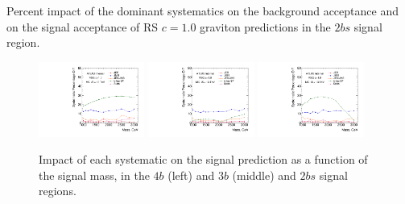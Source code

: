 
\begin{table}[htbp!]
\scriptsize
\begin{center}

\caption{Percent impact of the dominant systematics on the  background acceptance
         and on the signal acceptance of RS $c=1.0$ graviton predictions in the $2bs$ signal region.}
\label{tab:summary-systematics-2b}
\end{center}
\end{table}

\begin{figure}[htbp!]
\begin{center}
\includegraphics[width=0.31\textwidth,angle=-90]{figures/boosted/Syst_MC/FourTag_RSG_syst.pdf}
\includegraphics[width=0.31\textwidth,angle=-90]{figures/boosted/Syst_MC/ThreeTag_RSG_syst.pdf}
\includegraphics[width=0.31\textwidth,angle=-90]{figures/boosted/Syst_MC/TwoTag_split_RSG_syst.pdf}
\caption{Impact of each systematic on the signal prediction as a function of the signal mass, in the $4b$ (left) and $3b$ (middle) and $2bs$ signal regions.}
\label{fig:signal_syst_summary}
\end{center}
\end{figure}

